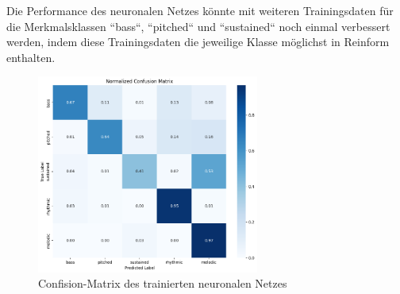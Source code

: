 \begin{adjustwidth}{0.5cm}{0cm}
Die Performance des neuronalen Netzes könnte mit weiteren Trainingsdaten für die Merkmalsklassen ``bass``, ``pitched`` und ``sustained`` noch einmal verbessert werden, indem diese Trainingsdaten die jeweilige Klasse möglichst in Reinform enthalten.

\begin{figure}[h!]
\centering
\includegraphics[width=0.65\textwidth]{images/10_test_validierung/nn/nn-confusion-matrix.png}
\caption{Confision-Matrix des trainierten neuronalen Netzes}
\label{fig:img-confusion-matrix}
\end{figure}

\end{adjustwidth}


